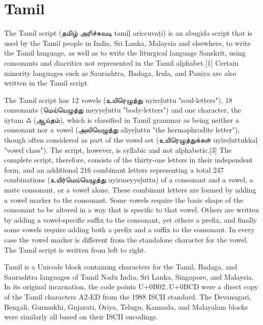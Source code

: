 \section{Tamil}
\newfontfamily{}

\def\tamiltext#1{{\tamil#1}}

The Tamil script (\tamiltext{தமிழ் அரிச்சுவடி} tamiḻ ariccuvaṭi) is an abugida script that is used by the Tamil people in India, Sri Lanka, Malaysia and elsewhere, to write the Tamil language, as well as to write the liturgical language Sanskrit, using consonants and diacritics not represented in the Tamil alphabet.[1] Certain minority languages such as Saurashtra, Badaga, Irula, and Paniya are also written in the Tamil script

The Tamil script has 12 vowels (\tamiltext{உயிரெழுத்து} uyireḻuttu "soul-letters"), 18 consonants (\tamiltext{மெய்யெழுத்து} meyyeḻuttu "body-letters") and one character, the āytam \tamiltext{ஃ (ஆய்தம்)}, which is classified in Tamil grammar as being neither a consonant nor a vowel (\tamiltext{அலியெழுத்து} aliyeḻuttu "the hermaphrodite letter"), though often considered as part of the vowel set (\tamiltext{உயிரெழுத்துக்கள்} uyireḻuttukkaḷ "vowel class"). The script, however, is syllabic and not alphabetic.[3] The complete script, therefore, consists of the thirty-one letters in their independent form, and an additional 216 combinant letters representing a total 247 combinations (\tamiltext{உயிர்மெய்யெழுத்து} uyirmeyyeḻuttu) of a consonant and a vowel, a mute consonant, or a vowel alone. These combinant letters are formed by adding a vowel marker to the consonant. Some vowels require the basic shape of the consonant to be altered in a way that is specific to that vowel. Others are written by adding a vowel-specific suffix to the consonant, yet others a prefix, and finally some vowels require adding both a prefix and a suffix to the consonant. In every case the vowel marker is different from the standalone character for the vowel.
The Tamil script is written from left to right.

Tamil is a Unicode block containing characters for the Tamil, Badaga, and Saurashtra languages of Tamil Nadu India, Sri Lanka, Singapore, and Malaysia. In its original incarnation, the code points U+0B02..U+0BCD were a direct copy of the Tamil characters A2-ED from the 1988 ISCII standard. The Devanagari, Bengali, Gurmukhi, Gujarati, Oriya, Telugu, Kannada, and Malayalam blocks were similarly all based on their ISCII encodings.

